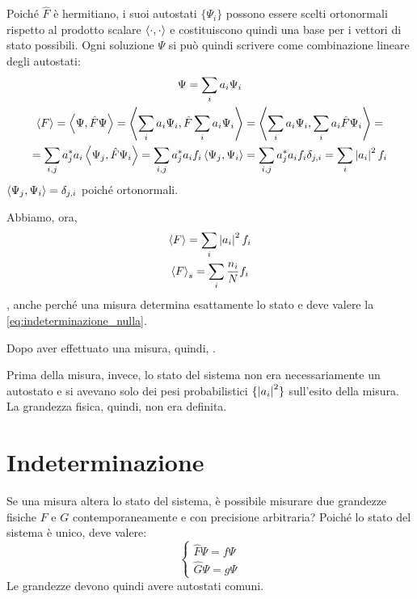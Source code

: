 Poiché $\hat{F}$ è hermitiano, i suoi autostati $\{\Psi_i\}$ possono essere scelti ortonormali rispetto al prodotto scalare $\left\langle \cdot, \cdot \right\rangle$ e costituiscono quindi una base per i vettori di stato possibili.
Ogni soluzione $\Psi$ si può quindi scrivere come combinazione lineare degli autostati:
\begin{gather}
    \Psi = \sum_i a_i \Psi_i \\
\begin{gathered}
    \left\langle F \right\rangle
    = \left\langle \Psi, \hat{F} \Psi \right\rangle
    = \left\langle \sum_i a_i \Psi_i, \hat{F} \sum_i a_i \Psi_i \right\rangle
    = \left\langle \sum_i a_i \Psi_i, \sum_i a_i \hat{F} \Psi_i \right\rangle = \\
    = \sum_{i,j} a_j^* a_i \left\langle \Psi_j, \hat{F} \Psi_i \right\rangle
    = \sum_{i,j} a_j^* a_i f_i \left\langle \Psi_j, \Psi_i \right\rangle
    = \sum_{i,j} a_j^* a_i f_i \delta_{j,i}
    = \sum_i \left\lvert a_i \right\rvert^2 f_i
\end{gathered}
\end{gather}
$\left\langle \Psi_j, \Psi_i \right\rangle = \delta_{j,i}$ poiché ortonormali.

Abbiamo, ora,
\begin{subequations}
\begin{gather}
    \left\langle F \right\rangle = \sum_i \left\lvert a_i \right\rvert^2 f_i \\
    \left\langle F \right\rangle_s = \sum_i \frac{n_i}{N} f_i
\end{gather}
\end{subequations}
, anche perché una misura determina esattamente lo stato e deve valere la \eqref{eq:indeterminazione_nulla}.

Dopo aver effettuato una misura, quindi, .

Prima della misura, invece, lo stato del sistema non era necessariamente un autostato e si avevano solo dei pesi probabilistici $\{\left\lvert a_i \right\rvert^2\}$ sull'esito della misura.
La grandezza fisica, quindi, non era definita.

\section{Indeterminazione}

Se una misura altera lo stato del sistema, è possibile misurare due grandezze fisiche $F$ e $G$ contemporaneamente e con precisione arbitraria?
Poiché lo stato del sistema è unico, deve valere:
\begin{equation}
    \begin{cases}
        \hat{F} \Psi = f \Psi \\
        \hat{G} \Psi = g \Psi
    \end{cases}
\end{equation}
Le grandezze devono quindi avere autostati comuni.

